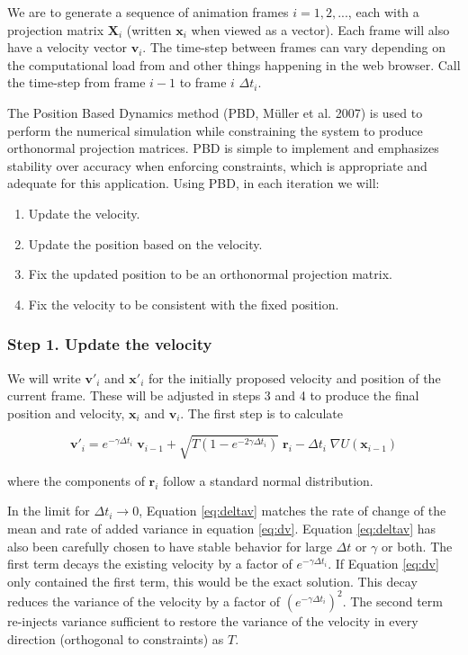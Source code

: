 We are to generate a sequence of animation frames \(i=1,2,...\), each with a projection matrix \(\mathbf X_i\) (written \(\mathbf x_i\) when viewed as a vector). Each frame will also have a velocity vector \(\mathbf v_i\). The time-step between frames can vary depending on the computational load from  and other things happening in the web browser. Call the time-step from frame \(i-1\) to frame \(i\) \(\Delta t_i\).

The Position Based Dynamics method (PBD, Müller et al. 2007) is used to perform the numerical simulation while constraining the system to produce orthonormal projection matrices. PBD is simple to implement and emphasizes stability over accuracy when enforcing constraints, which is appropriate and adequate for this application. Using PBD, in each iteration we will:

\begin{enumerate}
\def\labelenumi{\arabic{enumi}.}
\tightlist
\item
  Update the velocity.
\item
  Update the position based on the velocity.
\item
  Fix the updated position to be an orthonormal projection matrix.
\item
  Fix the velocity to be consistent with the fixed position.
\end{enumerate}

\hypertarget{step-1.-update-the-velocity}{%
\subsubsection{Step 1. Update the velocity}\label{step-1.-update-the-velocity}}

We will write \(\mathbf v'_i\) and \(\mathbf x'_i\) for the initially proposed velocity and position of the current frame. These will be adjusted in steps 3 and 4 to produce the final position and velocity, \(\mathbf x_i\) and \(\mathbf v_i\). The first step is to calculate

\begin{equation}
\mathbf v'_i = 
  e^{-\gamma \Delta t_i} \;  \mathbf v_{i-1} 
  + \sqrt{ T \left(1-e^{-2 \gamma \Delta t_i}\right) } \; \mathbf r_i 
  - \Delta t_i \; \nabla U(\mathbf x_{i-1})
  \label{eq:deltav}
\end{equation}

where the components of \(\mathbf r_i\) follow a standard normal distribution.

In the limit for \(\Delta t_i \rightarrow 0\), Equation \eqref{eq:deltav} matches the rate of change of the mean and rate of added variance in equation \eqref{eq:dv}. Equation \eqref{eq:deltav} has also been carefully chosen to have stable behavior for large \(\Delta t\) or \(\gamma\) or both. The first term decays the existing velocity by a factor of \(e^{-\gamma \Delta t_i}\). If Equation \eqref{eq:dv} only contained the first term, this would be the exact solution. This decay reduces the variance of the velocity by a factor of \(\left( e^{-\gamma \Delta t_i} \right) ^2\). The second term re-injects variance sufficient to restore the variance of the velocity in every direction (orthogonal to constraints) as \(T\).

